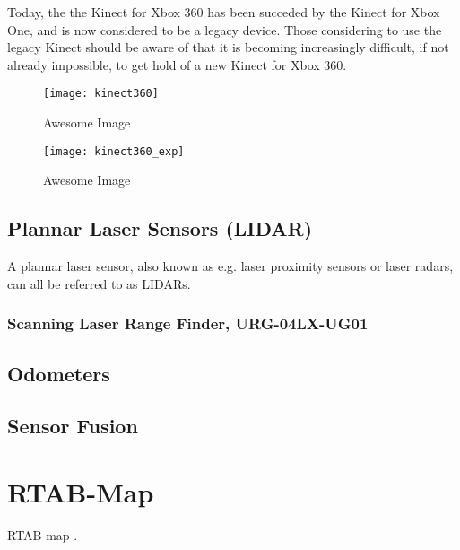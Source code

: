 Today, the the Kinect for Xbox 360 has been succeded by the Kinect for Xbox One, and is now considered to be a legacy device. Those considering to use the legacy Kinect should be aware of that it is becoming increasingly difficult, if not already impossible, to get hold of a new Kinect for Xbox 360. 

\begin{figure}[p]
    \centering
    \texttt{[image: kinect360]}
    \caption{Awesome Image}
    \label{fig:kinect360}
\end{figure}

\begin{figure}[p]
    \centering
    \texttt{[image: kinect360\_exp]}
    \caption{Awesome Image}
    \label{fig:kinect360_exp}
\end{figure}


\subsection{Plannar Laser Sensors (LIDAR)}

A plannar laser sensor, also known as e.g. laser proximity sensors or laser radars, can all be referred to as LIDARs. 

\subsubsection{Scanning Laser Range Finder, URG-04LX-UG01}


\subsection{Odometers}

\subsection{Sensor Fusion}


\section{RTAB-Map}

\ac{RTAB-map} \cite{RTAB_map}.